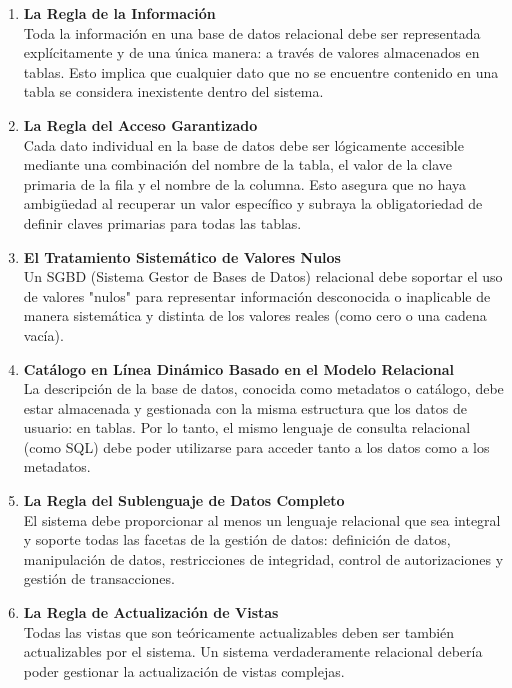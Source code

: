 \documentclass[12pt, a4paper]{article}
\begin{document}
\begin{enumerate}
    \item \textbf{La Regla de la Información} \\
    Toda la información en una base de datos relacional debe ser representada explícitamente y de una única manera: a través de valores almacenados en tablas. Esto implica que cualquier dato que no se encuentre contenido en una tabla se considera inexistente dentro del sistema.

    \item \textbf{La Regla del Acceso Garantizado} \\
    Cada dato individual en la base de datos debe ser lógicamente accesible mediante una combinación del nombre de la tabla, el valor de la clave primaria de la fila y el nombre de la columna. Esto asegura que no haya ambigüedad al recuperar un valor específico y subraya la obligatoriedad de definir claves primarias para todas las tablas.

    \item \textbf{El Tratamiento Sistemático de Valores Nulos} \\
    Un SGBD (Sistema Gestor de Bases de Datos) relacional debe soportar el uso de valores "nulos" para representar información desconocida o inaplicable de manera sistemática y distinta de los valores reales (como cero o una cadena vacía).

    \item \textbf{Catálogo en Línea Dinámico Basado en el Modelo Relacional} \\
    La descripción de la base de datos, conocida como metadatos o catálogo, debe estar almacenada y gestionada con la misma estructura que los datos de usuario: en tablas. Por lo tanto, el mismo lenguaje de consulta relacional (como SQL) debe poder utilizarse para acceder tanto a los datos como a los metadatos.

    \item \textbf{La Regla del Sublenguaje de Datos Completo} \\
    El sistema debe proporcionar al menos un lenguaje relacional que sea integral y soporte todas las facetas de la gestión de datos: definición de datos, manipulación de datos, restricciones de integridad, control de autorizaciones y gestión de transacciones.

    \item \textbf{La Regla de Actualización de Vistas} \\
    Todas las vistas que son teóricamente actualizables deben ser también actualizables por el sistema. Un sistema verdaderamente relacional debería poder gestionar la actualización de vistas complejas.


\end{enumerate}
\end{document}

